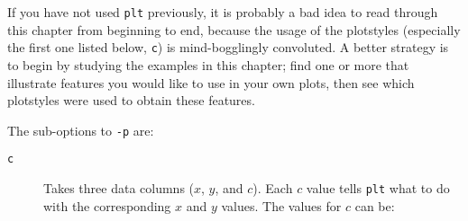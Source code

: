 \documentclass{book}
\begin{document}
If you have not used {\tt plt} previously, it is probably a bad idea
to read through this chapter from beginning to end, because the usage
of the plotstyles (especially the first one listed below, {\tt c}) is
mind-bogglingly convoluted.  A better strategy is to begin by studying
the examples in this chapter; find one or more that illustrate
features you would like to use in your own plots, then see which
plotstyles were used to obtain these features.

\newpage
The sub-options to {\tt -p} are:

%
\begin{description}
\item[{\tt c}]
Takes three data columns ($x$, $y$, and $c$).
Each $c$ value tells {\tt plt} what to do with the corresponding $x$
and $y$ values.  The values for $c$ can be:
\end{description}
\end{document}
